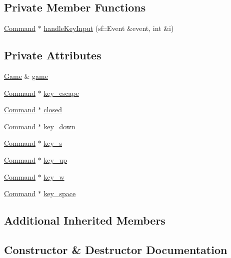 \subsection*{Private Member Functions}
\begin{DoxyCompactItemize}
\item 
\hyperlink{class_command}{Command} $\ast$ \hyperlink{class_menu_input_handler_aefd1edfd9f0d0770383c4977416de3bf}{handle\+Key\+Input} (sf\+::\+Event \&event, int \&i)
\end{DoxyCompactItemize}
\subsection*{Private Attributes}
\begin{DoxyCompactItemize}
\item 
\hyperlink{class_game}{Game} \& \hyperlink{class_menu_input_handler_a49048af3c063e2b81ef6b296e9ad762c}{game}
\item 
\hyperlink{class_command}{Command} $\ast$ \hyperlink{class_menu_input_handler_adf7d52189051df678adfdceddc85d122}{key\+\_\+escape}
\item 
\hyperlink{class_command}{Command} $\ast$ \hyperlink{class_menu_input_handler_ab78952869f0d0785abb8d63a703a3a90}{closed}
\item 
\hyperlink{class_command}{Command} $\ast$ \hyperlink{class_menu_input_handler_a281b50f5082ec9650a61d070a09d76c5}{key\+\_\+down}
\item 
\hyperlink{class_command}{Command} $\ast$ \hyperlink{class_menu_input_handler_ad3ceb5cae1d9f9a3856bf98e979255f8}{key\+\_\+s}
\item 
\hyperlink{class_command}{Command} $\ast$ \hyperlink{class_menu_input_handler_a9a87e9f15ddde05aa256bc387377df23}{key\+\_\+up}
\item 
\hyperlink{class_command}{Command} $\ast$ \hyperlink{class_menu_input_handler_a895525d46e8ddbdda01a2d66dc57d387}{key\+\_\+w}
\item 
\hyperlink{class_command}{Command} $\ast$ \hyperlink{class_menu_input_handler_ae824111d212fbb054d1bed494bb1e4db}{key\+\_\+space}
\end{DoxyCompactItemize}
\subsection*{Additional Inherited Members}


\subsection{Constructor \& Destructor Documentation}
\hypertarget{class_menu_input_handler_ae0a666273bb8b76cea8352e600b987fc}{}
